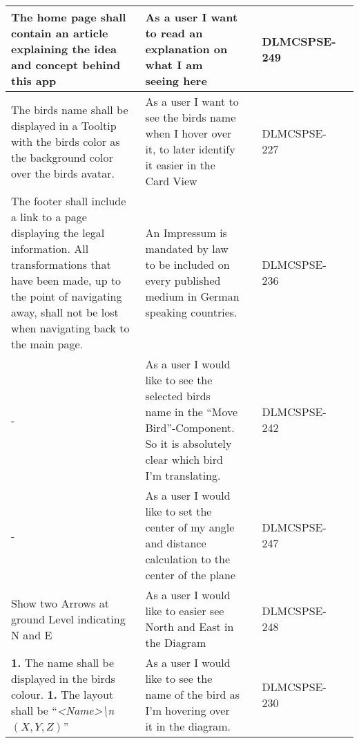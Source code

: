 \begin{xltabular}{\textwidth}{|X|X|M{1.8cm}|M{1.4cm}|M{1.3cm}|}
  The home page shall contain an article explaining the idea and concept behind this app & As a user I want to read an explanation on what I am seeing here &  & {\color{purpleT}\ttfamily DLMCSPSE-249} &  \\ \hline 
  The birds name shall be displayed in a Tooltip with the birds color as the background color over the birds avatar. & As a user I want to see the birds name when I hover over it, to later identify it easier in the Card View &  & {\color{purpleT}\ttfamily DLMCSPSE-227} &  \\ \hline 
  The footer shall include a link to a page displaying the legal information. \newline All transformations that have been made, up to the point of navigating away, shall not be lost when navigating back to the main page. & An Impressum is mandated by law to be included on every published medium in German speaking countries. &  & {\color{purpleT}\ttfamily DLMCSPSE-236} &  \\ \hline 
  - & As a user I would like to see the selected birds name in the “Move Bird”-Component. So it is absolutely clear which bird I’m translating. &  & {\color{purpleT}\ttfamily DLMCSPSE-242} &  \\ \hline 
  - & As a user I would like to set the center of my angle and distance calculation to the center of the plane &  & {\color{purpleT}\ttfamily DLMCSPSE-247} &  \\ \hline 
  Show two Arrows at ground Level indicating N and E & As a user I would like to easier see North and East in the Diagram &  & {\color{purpleT}\ttfamily DLMCSPSE-248} &  \\ \hline 
  \textbf{1.} The name shall be displayed in the birds colour. \newline\newline \textbf{1.} The layout shall be \enquote{\textit{\textless Name\textgreater \textbackslash n$(X,Y,Z)$}} & As a user I would like to see the name of the bird as I’m hovering over it in the diagram. &  & {\color{purpleT}\ttfamily DLMCSPSE-230} &  \\ \hline 

\end{xltabular}
